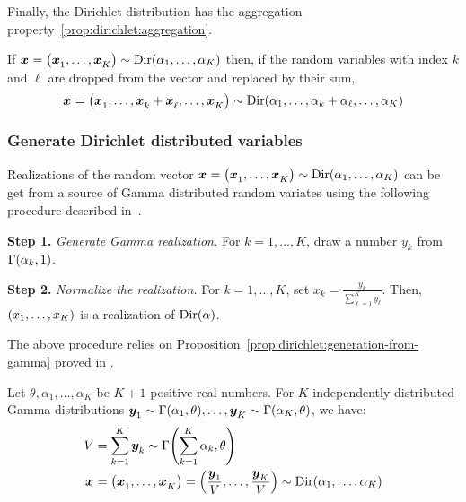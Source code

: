 Finally, the Dirichlet distribution has the aggregation property~\ref{prop:dirichlet:aggregation}.

\begin{prop}\label{prop:dirichlet:aggregation}
  If $\va x=\bracket{\va x_1,\ldots,\va x_K}\sim \Dir\bracket{\alpha_1,\ldots,\alpha_K}$ then, if the random variables with index $k$ and $\ell$ are dropped from the vector and replaced by their sum,
  $$\va x=\bracket{\va x_1,\ldots,\va x_k+\va x_{\ell},\ldots,\va x_K}\sim \Dir\bracket{\alpha_1,\ldots,\alpha_k+\alpha_{\ell},\ldots,\alpha_K}$$
\end{prop}



\subsubsection{Generate Dirichlet distributed variables}


Realizations of the random vector $\va x=\bracket{\va x_1,\ldots,\va x_K}\sim\Dir\bracket{\alpha_1,\ldots,\alpha_K}$ can be get from a source of Gamma distributed random variates using the following procedure described in~\cite{Frigyik2010}.

\textbf{Step 1.} \emph{Generate Gamma realization.} For $k=1,\ldots,K$, draw a number $y_k$ from $\Gamma\bracket{\alpha_k,1}$.

\textbf{Step 2.} \emph{Normalize the realization.} For $k=1,\ldots,K$, set $x_k=\frac{y_k}{\sum_{\ell=1}^K y_{\ell}}$. Then, $\bracket{x_1,\ldots,x_K}$ is a realization of $\Dir\bracket{\alpha}$.

The above procedure relies on Proposition~\ref{prop:dirichlet:generation-from-gamma} proved in \cite{Devroye1986}.

\begin{prop}\label{prop:dirichlet:generation-from-gamma}
  Let $\theta,\alpha_1,\ldots,\alpha_K$ be $K+1$ positive real numbers.
  For $K$ independently distributed Gamma distributions
  $\va y_1\sim\Gamma\bracket{\alpha_1,\theta},\ldots,\va y_K\sim\Gamma\bracket{\alpha_K,\theta}$,
  we have:
  \begin{subequations}
    \begin{align*}
      V &= \sum_{k=1}^K \va y_k \sim \Gamma\bracket{\sum_{k=1}^K \alpha_k,\theta}
      \\
      \va x &= \bracket{\va x_1,\ldots,\va x_K} = \bracket{\frac{\va y_1}{V},\ldots,\frac{\va y_K}{V}} \sim \Dir\bracket{\alpha_1,\ldots,\alpha_K}
    \end{align*}
  \end{subequations}
\end{prop}

